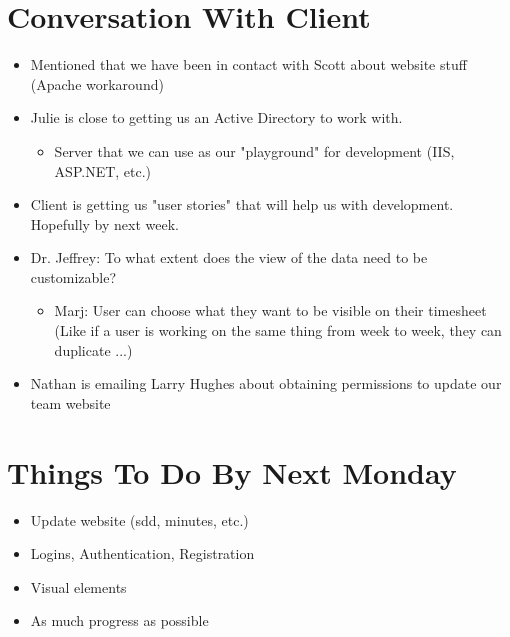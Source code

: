 \documentclass{article}
\begin{document}
\section{Conversation With Client}
\begin{itemize}
\item Mentioned that we have been in contact with Scott about website stuff (Apache workaround)
\item Julie is close to getting us an Active Directory to work with. 
	\begin{itemize}
	\item Server that we can use as our "playground" for development (IIS, ASP.NET, etc.)
	\end{itemize}
\item Client is getting us "user stories" that will help us with development. Hopefully by next week.
\item Dr. Jeffrey:  To what extent does the view of the data need to be customizable?
	\begin{itemize}
	\item Marj: User can choose what they want to be visible on their timesheet (Like if a user is working on the same thing from week to week, they can duplicate ...) 
	\end{itemize}
\item Nathan is emailing Larry Hughes about obtaining permissions to update our team website
\end{itemize}

\section{Things To Do By Next Monday}
\begin{itemize}
\item Update website (sdd, minutes, etc.)
\item Logins, Authentication, Registration
\item Visual elements
\item As much progress as possible
\end{itemize}
\end{document}
